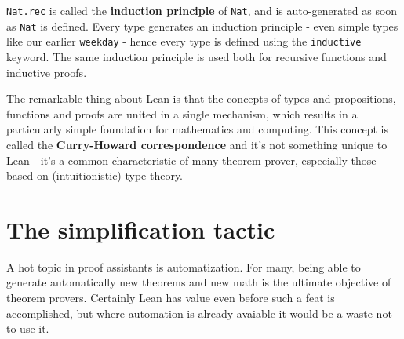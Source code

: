 \documentclass{book}
\theoremstyle{definition}
\theoremstyle{remark}
\theoremstyle{plain}
\begin{document}
\lstinline{Nat.rec} is called the \textbf{induction principle} of \lstinline{Nat},
and is auto-generated as soon as \lstinline{Nat} is defined.
Every type generates an induction principle - even simple types like our earlier \lstinline{weekday} -
hence every type is defined using the \lstinline{inductive} keyword.
The same induction principle is used both for recursive functions and inductive proofs.

The remarkable thing about Lean is that the concepts of types and propositions, functions and proofs are united in a single mechanism,
which results in a particularly simple foundation for mathematics and computing.
This concept is called the \textbf{Curry-Howard correspondence} and it's not something unique to Lean -
it's a common characteristic of many theorem prover, especially those based on (intuitionistic) type theory.

\section{The simplification tactic}

A hot topic in proof assistants is automatization.
For many, being able to generate automatically new theorems and new math is the ultimate objective of theorem provers.
Certainly Lean has value even before such a feat is accomplished,
but where automation is already avaiable it would be a waste not to use it.
\end{document}
